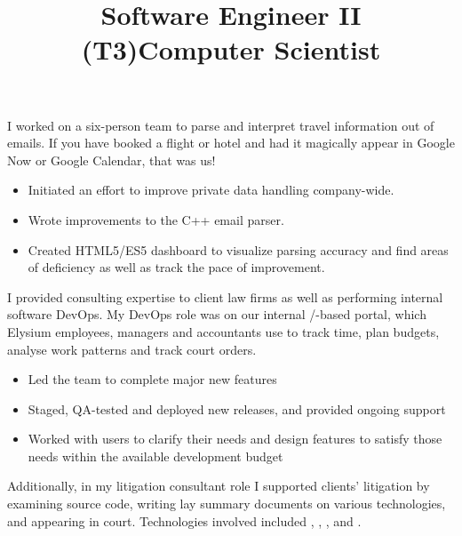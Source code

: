 \begin{resume}
\title{Software Engineer II (T3)}
\begin{position}
I worked on a six-person team to parse and interpret travel information out of
emails. If you have booked a flight or hotel and had it magically appear in
Google Now or Google Calendar, that was us!
\begin{itemize} 
  \item Initiated an effort to improve private data handling company-wide.
  \item Wrote improvements to the C++ email parser.
  \item Created HTML5/ES5 dashboard to visualize parsing accuracy and find areas
        of deficiency as well as track the pace of improvement.
\end{itemize}

\end{position}


\title{Computer Scientist}
\begin{position}
I provided consulting expertise to client law firms as well as performing
internal software DevOps. My DevOps role was on our internal
/-based portal, which Elysium employees, managers and
accountants use to track
time, plan budgets, analyse work patterns and track court orders.

\begin{itemize}
\item Led the team to complete major new features
\item Staged, QA-tested and deployed new releases, and provided ongoing support
\item Worked with users to clarify their needs and design features to satisfy
those needs within the available development budget
\end{itemize}

Additionally, in my litigation consultant role I supported clients' litigation
by examining source code, writing lay summary documents on various
technologies, and appearing in court. Technologies involved included
, , ,  and
.
\end{position}


\end{resume}

